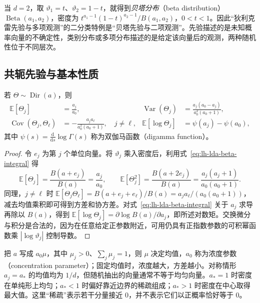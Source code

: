 当 $d=2$，取 $\vartheta_1=t$、$\vartheta_2=1-t$，就得到\emph{贝塔分布}（beta distribution）$\operatorname{Beta}(a_1,a_2)$，密度为 $t^{a_1-1}(1-t)^{a_2-1}/B(a_1,a_2)$，$0<t<1$。因此“狄利克雷先验与多项观测”的二分类特例是“贝塔先验与二项观测”。先验描述的是未知概率向量的不确定性，类别分布或多项分布描述的是给定该向量后的观测，两种随机性位于不同层次。

\subsection{共轭先验与基本性质}
\label{subsec:lh-lda-dirichlet-conjugacy}

\begin{proposition}[矩与对数矩]
\label{prop:lh-lda-dirichlet-moments}
若 $\Theta\sim\operatorname{Dir}(a)$，则
\begin{align}
\mathbb E[\Theta_j]&=\frac{a_j}{a_0},&
\operatorname{Var}(\Theta_j)&=\frac{a_j(a_0-a_j)}{a_0^2(a_0+1)},
\label{eq:lh-lda-dirichlet-moments}\\
\operatorname{Cov}(\Theta_j,\Theta_\ell)&=-\frac{a_ja_\ell}{a_0^2(a_0+1)},\quad j\ne\ell,&
\mathbb E[\log\Theta_j]&=\psi(a_j)-\psi(a_0),
\label{eq:lh-lda-dirichlet-logmoment}
\end{align}
其中 $\psi(s)=\frac{\mathrm d}{\mathrm ds}\log\Gamma(s)$ 称为双伽马函数（digamma function）。
\end{proposition}
\begin{proof}
令 $e_j$ 为第 $j$ 个单位向量。将 $\vartheta_j$ 乘入密度后，利用式~\eqref{eq:lh-lda-beta-integral} 得
\[
\mathbb E[\Theta_j]=\frac{B(a+e_j)}{B(a)}=\frac{a_j}{a_0},\qquad
\mathbb E[\Theta_j^2]=\frac{B(a+2e_j)}{B(a)}
=\frac{a_j(a_j+1)}{a_0(a_0+1)}.
\]
同理，$j\ne\ell$ 时 $\mathbb E[\Theta_j\Theta_\ell]=B(a+e_j+e_\ell)/B(a)=a_ja_\ell/(a_0(a_0+1))$，减去均值乘积即可得到方差和协方差。对式~\eqref{eq:lh-lda-beta-integral} 关于 $a_j$ 求导再除以 $B(a)$，得到 $\mathbb E[\log\Theta_j]=\partial\log B(a)/\partial a_j$，即所述对数矩。交换微分与积分是合法的，因为在任意给定正参数附近，可用仍具有正指数参数的可积幂函数乘 $|\log\vartheta_j|$ 控制导数。
\end{proof}

把 $a$ 写成 $a_0\mu$，其中 $\mu_j>0$、$\sum_j\mu_j=1$，则 $\mu$ 决定均值，$a_0$ 称为浓度参数（concentration parameter）；固定均值时，浓度越大，方差越小。对称情形 $a_j=a_\ast$ 的均值均为 $1/d$，但随机抽出的向量通常不等于均匀向量。$a_\ast=1$ 时密度在单纯形上均匀；$a_\ast<1$ 时偏好靠近边界的稀疏组成；$a_\ast>1$ 时密度在中心取得最大值。这里“稀疏”表示若干分量接近 $0$，并不表示它们以正概率恰好等于 $0$。

